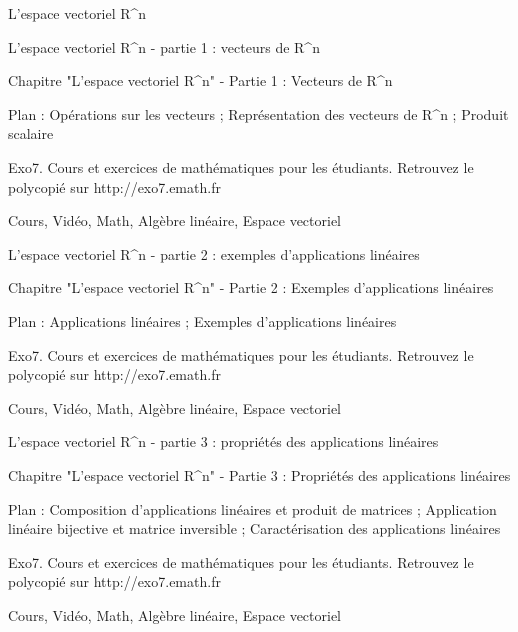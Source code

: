 
   L'espace vectoriel R^n




L'espace vectoriel R^n - partie 1 : vecteurs de R^n



Chapitre "L'espace vectoriel R^n" - Partie 1 : Vecteurs de R^n

Plan : Opérations sur les vecteurs ; 
Représentation des vecteurs de R^n ; Produit scalaire

Exo7. Cours et exercices de mathématiques pour les étudiants.
Retrouvez le polycopié sur http://exo7.emath.fr


Cours, Vidéo, Math, Algèbre linéaire, Espace vectoriel




L'espace vectoriel R^n - partie 2 : exemples d'applications linéaires



Chapitre "L'espace vectoriel R^n" - Partie 2 : Exemples d'applications linéaires

Plan : Applications linéaires ; Exemples d'applications linéaires

Exo7. Cours et exercices de mathématiques pour les étudiants.
Retrouvez le polycopié sur http://exo7.emath.fr


Cours, Vidéo, Math, Algèbre linéaire, Espace vectoriel




L'espace vectoriel R^n - partie 3 : propriétés des applications linéaires



Chapitre "L'espace vectoriel R^n" - Partie 3 : Propriétés des applications linéaires

Plan : Composition d'applications linéaires et produit de matrices ; 
Application linéaire bijective et matrice inversible ; 
Caractérisation des applications linéaires

Exo7. Cours et exercices de mathématiques pour les étudiants.
Retrouvez le polycopié sur http://exo7.emath.fr


Cours, Vidéo, Math, Algèbre linéaire, Espace vectoriel



